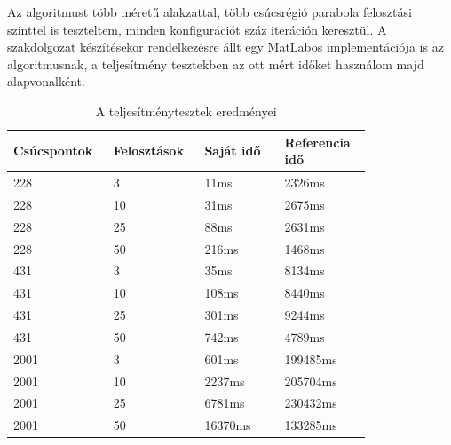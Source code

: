 Az algoritmust több méretű alakzattal, több csúcsrégió parabola felosztási szinttel is teszteltem, minden konfigurációt száz iteráción keresztül. A szakdolgozat készítésekor rendelkezésre állt egy MatLabos implementációja is az algoritmusnak, a teljesítmény tesztekben az ott mért időket használom majd alapvonalként.

\begin{table}[H]
	\centering
	\begin{tabular}{ | m{0.2\linewidth} | m{0.2\linewidth} | m{0.2\linewidth} | m{0.2\linewidth} | }
		\hline
		\textbf{Csúcspontok} & \textbf{Felosztások}  & \textbf{Saját idő}  & \textbf{Referencia idő} \\
		\hline \hline
		228 & 3 & 11ms & 2326ms \\
		\hline
		228 & 10 & 31ms & 2675ms \\
		\hline
		228 & 25 & 88ms & 2631ms \\
		\hline
		228 & 50 & 216ms & 1468ms \\
		\hline
		431 & 3 & 35ms & 8134ms \\
		\hline
		431 & 10 & 108ms & 8440ms \\
		\hline
		431 & 25 & 301ms & 9244ms \\
		\hline
		431 & 50 & 742ms & 4789ms \\
		\hline
		2001 & 3 & 601ms & 199485ms \\
		\hline
		2001 & 10 & 2237ms & 205704ms \\
		\hline
		2001 & 25 & 6781ms & 230432ms \\
		\hline
		2001 & 50 & 16370ms & 133285ms \\
		\hline
	\end{tabular}
	\caption{A teljesítménytesztek eredményei}
	\label{tab:benchmarks}
\end{table}
